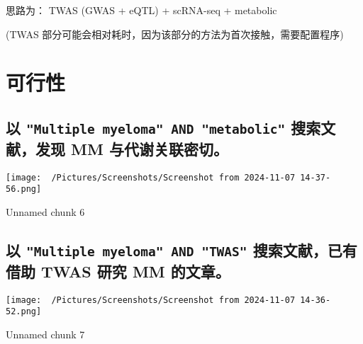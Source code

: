 \documentclass[
]{article}
\begin{document}
思路为： TWAS (GWAS + eQTL) + scRNA-seq + metabolic

(TWAS 部分可能会相对耗时，因为该部分的方法为首次接触，需要配置程序)

\hypertarget{methods}{%
\section{可行性}\label{methods}}

\hypertarget{ux4ee5-multiple-myeloma-and-metabolic-ux641cux7d22ux6587ux732eux53d1ux73b0-mm-ux4e0eux4ee3ux8c22ux5173ux8054ux5bc6ux5207}{%
\subsection{\texorpdfstring{以 \texttt{"Multiple\ myeloma"\ AND\ "metabolic"} 搜索文献，发现 MM 与代谢关联密切。}{以 "Multiple myeloma" AND "metabolic" 搜索文献，发现 MM 与代谢关联密切。}}\label{ux4ee5-multiple-myeloma-and-metabolic-ux641cux7d22ux6587ux732eux53d1ux73b0-mm-ux4e0eux4ee3ux8c22ux5173ux8054ux5bc6ux5207}}

\begin{center}\vspace{1.5cm}\end{center}
\def\@captype{figure}
\begin{center}
\texttt{[image: ~/Pictures/Screenshots/Screenshot from 2024-11-07 14-37-56.png]}
\caption{Unnamed chunk 6}\label{fig:unnamed-chunk-6}
\end{center}

\begin{center}\vspace{1.5cm}\end{center}

\hypertarget{ux4ee5-multiple-myeloma-and-twas-ux641cux7d22ux6587ux732eux5df2ux6709ux501fux52a9-twas-ux7814ux7a76-mm-ux7684ux6587ux7ae0}{%
\subsection{\texorpdfstring{以 \texttt{"Multiple\ myeloma"\ AND\ "TWAS"} 搜索文献，已有借助 TWAS 研究 MM 的文章。}{以 "Multiple myeloma" AND "TWAS" 搜索文献，已有借助 TWAS 研究 MM 的文章。}}\label{ux4ee5-multiple-myeloma-and-twas-ux641cux7d22ux6587ux732eux5df2ux6709ux501fux52a9-twas-ux7814ux7a76-mm-ux7684ux6587ux7ae0}}

\begin{center}\vspace{1.5cm}\end{center}
\def\@captype{figure}
\begin{center}
\texttt{[image: ~/Pictures/Screenshots/Screenshot from 2024-11-07 14-36-52.png]}
\caption{Unnamed chunk 7}\label{fig:unnamed-chunk-7}
\end{center}
\end{document}
